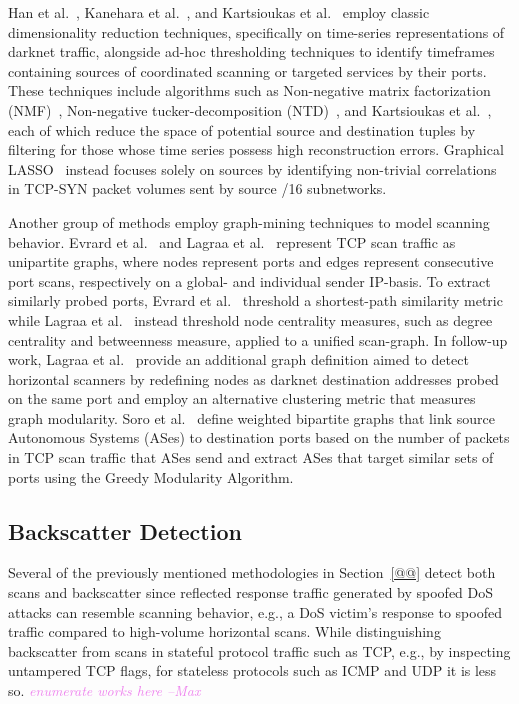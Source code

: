 \documentclass[manuscript,nonacm]{acmart}
\newcommand{\maxnote}[1]{\textit{\textcolor{violet}{#1 --Max}}}
\begin{document}
\vspace{0.25em}
\noindent{\textbf{}}
Han et al.~\cite{@@}, Kanehara et al.~\cite{@@}, and Kartsioukas et al.~\cite{@@} employ classic dimensionality reduction techniques, specifically on time-series representations of darknet traffic, alongside ad-hoc thresholding techniques to identify timeframes containing sources of coordinated scanning or targeted services by their ports.
These techniques include algorithms such as Non-negative matrix factorization (NMF)~\cite{@@}, Non-negative tucker-decomposition (NTD)~\cite{@@}, and Kartsioukas et al.~\cite{@@}, each of which reduce the space of potential source and destination tuples by filtering for those whose time series possess high reconstruction errors. 
Graphical LASSO~\cite{@@} instead focuses solely on sources by identifying non-trivial correlations in TCP-SYN packet volumes sent by source /16 subnetworks.

Another group of methods employ graph-mining techniques to model scanning behavior.
Evrard et al.~\cite{@@} and Lagraa et al.~\cite{@@} represent TCP scan traffic as unipartite graphs, where nodes represent ports and edges represent consecutive port scans, respectively on a global- and individual sender IP-basis. 
To extract similarly probed ports, Evrard et al.~\cite{@@} threshold a shortest-path similarity metric while Lagraa et al.~\cite{@@} instead threshold node centrality measures, such as degree centrality and betweenness measure, applied to a unified scan-graph.
In follow-up work, Lagraa et al.~\cite{@@} provide an additional graph definition aimed to detect horizontal scanners by redefining nodes as darknet destination addresses probed on the same port and employ an alternative clustering metric that measures graph modularity.
Soro et al.~\cite{@@} define weighted bipartite graphs that link source Autonomous Systems (ASes) to destination ports based on the number of packets in TCP scan traffic that ASes send and extract ASes that target similar sets of ports using the Greedy Modularity Algorithm.


\subsection{Backscatter Detection}
Several of the previously mentioned methodologies in Section~\ref{@@} detect both scans and backscatter since reflected response traffic generated by spoofed DoS attacks can resemble scanning behavior, e.g., a DoS victim's response to spoofed traffic compared to high-volume horizontal scans.
While distinguishing backscatter from scans in stateful protocol traffic such as TCP, e.g., by inspecting untampered TCP flags, for stateless protocols such as ICMP and UDP it is less so. 
\maxnote{enumerate works here}
\end{document}
